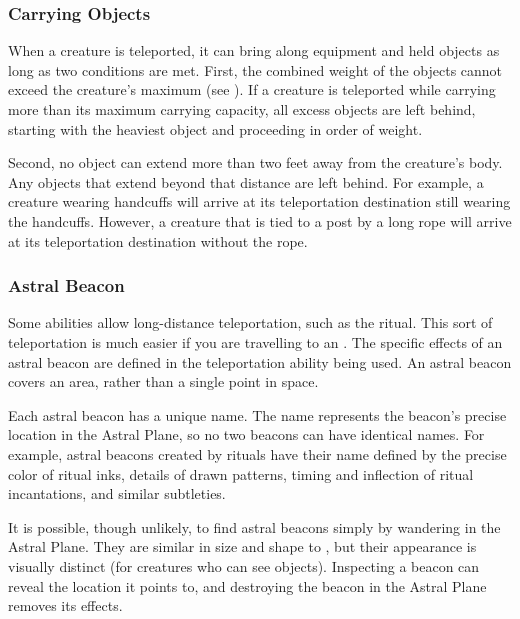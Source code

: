     \subsubsection{Carrying Objects}
      When a creature is teleported, it can bring along equipment and held objects as long as two conditions are met.
      First, the combined weight of the objects cannot exceed the creature's maximum  (see ).
      If a creature is teleported while carrying more than its maximum carrying capacity, all excess objects are left behind, starting with the heaviest object and proceeding in order of weight.

      Second, no object can extend more than two feet away from the creature's body.
      Any objects that extend beyond that distance are left behind.
      For example, a creature wearing handcuffs will arrive at its teleportation destination still wearing the handcuffs.
      However, a creature that is tied to a post by a long rope will arrive at its teleportation destination without the rope.

    \subsubsection{Astral Beacon}\label{Astral Beacon}
      Some abilities allow long-distance teleportation, such as the  ritual.
      This sort of teleportation is much easier if you are travelling to an .
      The specific effects of an astral beacon are defined in the teleportation ability being used.
      An astral beacon covers an area, rather than a single point in space.

      Each astral beacon has a unique name.
      The name represents the beacon's precise location in the Astral Plane, so no two beacons can have identical names.
      For example, astral beacons created by rituals have their name defined by the precise color of ritual inks, details of drawn patterns, timing and inflection of ritual incantations, and similar subtleties.

      It is possible, though unlikely, to find astral beacons simply by wandering in the Astral Plane.
      They are similar in size and shape to , but their appearance is visually distinct (for creatures who can see  objects).
      Inspecting a beacon can reveal the location it points to, and destroying the beacon in the Astral Plane removes its effects.

